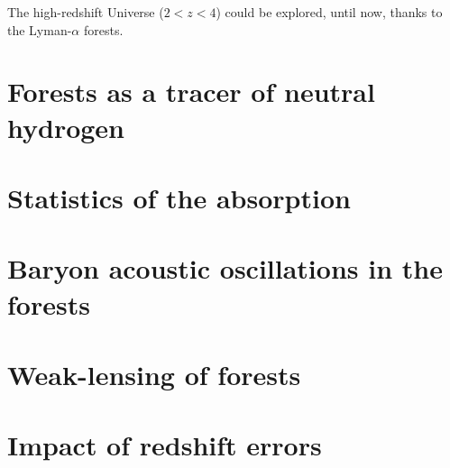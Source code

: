 \chaptertoc{}

The high-redshift Universe ($2<z<4$) could be explored, until now, thanks
to the Lyman-$\alpha$ forests. 

\section{Forests as a tracer of neutral hydrogen}

\section{Statistics of the absorption}

\section{Baryon acoustic oscillations in the forests}

\section{Weak-lensing of forests}

\section{Impact of redshift errors}


